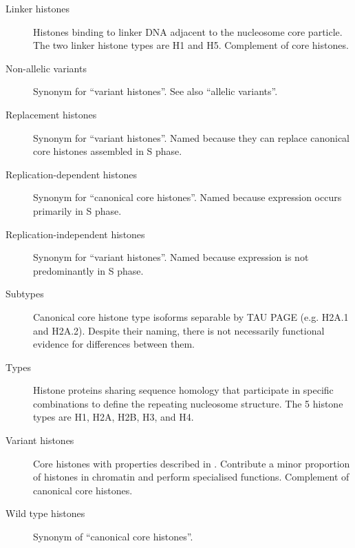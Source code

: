 \begin{featurebox}
\begin{description}
        \item[Linker histones] \hfill \newline
        Histones binding to linker DNA adjacent to the nucleosome core particle.
        The two linker histone types are H1 and H5. Complement of core histones.

        \item[Non-allelic variants] \hfill \newline
        Synonym for ``variant histones''. See also ``allelic variants''.

        \item[Replacement histones] \hfill \newline
        Synonym for ``variant histones''.
        Named because they can replace canonical core histones assembled in S phase.

        \item[Replication-dependent histones] \hfill \newline
        Synonym for ``canonical core histones''.
        Named because expression occurs primarily in S phase.

        \item[Replication-independent histones] \hfill \newline
        Synonym for ``variant histones''.
        Named because expression is not predominantly in S phase.

        \item[Subtypes] \hfill \newline
        Canonical core histone type isoforms separable by TAU PAGE
        (e.g. H2A.1 and H2A.2).  Despite their naming, there is not necessarily functional evidence
        for differences between them.

        \item[Types] \hfill \newline
        Histone proteins sharing sequence homology
        that participate in specific combinations to define the repeating nucleosome structure.
        The 5 histone types are H1, H2A, H2B, H3, and H4.

        \item[Variant histones] \hfill \newline
        Core histones with properties described in .
        Contribute a minor proportion of histones in chromatin and perform specialised functions.
        Complement of canonical core histones.

        \item[Wild type histones] \hfill \newline
        Synonym of ``canonical core histones''.
      \end{description}
    \end{featurebox}

